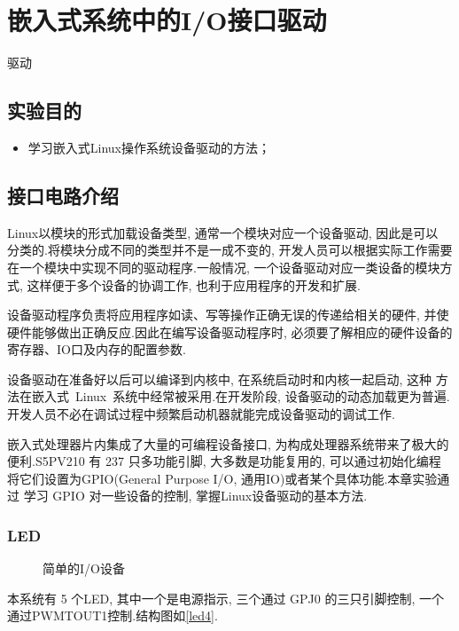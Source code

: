 \chapter{嵌入式系统中的I/O接口驱动}{驱动}

\section{实验目的}
\begin{itemize}\itemsep=-3pt
  \item 学习嵌入式Linux操作系统设备驱动的方法；
\end{itemize}

\section{接口电路介绍}
	Linux以模块的形式加载设备类型, 通常一个模块对应一个设备驱动, 因此是可以
分类的.将模块分成不同的类型并不是一成不变的, 开发人员可以根据实际工作需要
在一个模块中实现不同的驱动程序.一般情况, 一个设备驱动对应一类设备的模块方式, 
这样便于多个设备的协调工作, 也利于应用程序的开发和扩展.

	设备驱动程序负责将应用程序如读、写等操作正确无误的传递给相关的硬件, 并使
硬件能够做出正确反应.因此在编写设备驱动程序时, 必须要了解相应的硬件设备的
寄存器、IO口及内存的配置参数.

	设备驱动在准备好以后可以编译到内核中, 在系统启动时和内核一起启动, 这种
方法在嵌入式~Linux~系统中经常被采用.在开发阶段, 设备驱动的动态加载更为普遍.
开发人员不必在调试过程中频繁启动机器就能完成设备驱动的调试工作.

	嵌入式处理器片内集成了大量的可编程设备接口, 为构成处理器系统带来了极大的
便利.S5PV210 有 237 只多功能引脚, 大多数是功能复用的, 可以通过初始化编程
将它们设置为GPIO(General Purpose I/O, 通用IO)或者某个具体功能.本章实验通过
学习 GPIO 对一些设备的控制, 掌握Linux设备驱动的基本方法.

\subsection{LED}
\begin{figure}
\centering
{}\hspace{5mm}
\caption{简单的I/O设备}\label{simple_IO}
\end{figure}

	本系统有 5 个LED, 其中一个是电源指示, 三个通过 GPJ0 的三只引脚控制,
一个通过PWMTOUT1控制.结构图如\ref{led4}.

